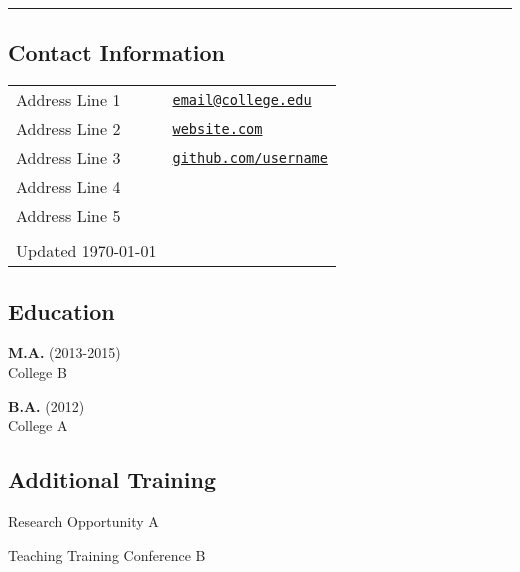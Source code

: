 \documentclass[letterpaper,11pt]{CV} %
\newcommand{\name}{Example CV}
\begin{document}
 {\hspace*{-\marginparsep minus \marginparwidth}%
 	\begin{minipage}[t]{\textwidth+\marginparwidth+\marginparsep}%
 		{%
 			\Huge \tsc{\textbf{\name}}}
 		
 		\medskip
 		\rule{\columnwidth}{1.2pt}
 \end{minipage}}


\subsection{Contact Information}

\vspace{.05in}
\begin{tabular}{@{}p{2.75in}p{2.5in}}
	Address Line 1  & {\faAt} \href{mailto:jenniferlin2025@u.northwestern.edu}{\texttt{email@college.edu}} \\
	Address Line 2                     & 
	{\faGlobe} \href{https://lin-jennifer.github.io}{\texttt{website.com}}\\
	Address Line 3  & {\faGithub} \href{http://github.com/lin-jennifer}{\texttt{github.com/username}}\\
	Address Line 4 &\\
	Address Line 5 &\\
	&\\
	Updated \today &\\
\end{tabular}
 \vspace{0.2cm}

\subsection{Education}

\textbf{M.A.} \hfill(2013-2015) \\
College B
 

\vspace{0.1cm}

\textbf{B.A.} \hfill (2012)  \\
College A


\subsection{Additional Training}

Research Opportunity A

Teaching Training Conference B

\end{document}
